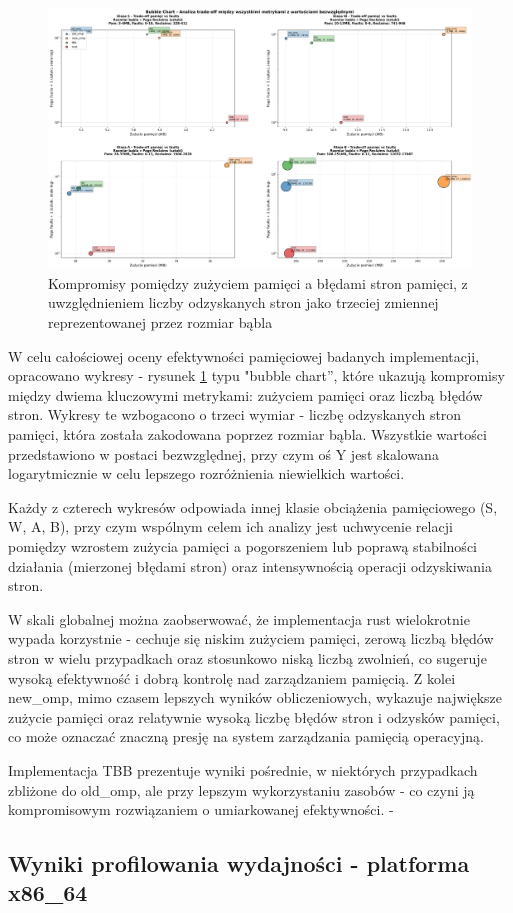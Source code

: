 \begin{figure}[H]
    \centering
    \includegraphics[width=\textwidth]{analiza/images/parallel/cg/chart_06_bubble_chart.png}
    \caption{Kompromisy  pomiędzy zużyciem pamięci a błędami stron pamięci, z uwzględnieniem liczby odzyskanych stron jako trzeciej zmiennej reprezentowanej przez rozmiar bąbla}
    \label{cg_kompromisy_pamiec_bledy}
\end{figure}

W celu całościowej oceny efektywności pamięciowej badanych implementacji, opracowano wykresy - rysunek \ref{cg_kompromisy_pamiec_bledy} typu "bubble chart”, które ukazują kompromisy między dwiema kluczowymi metrykami: zużyciem pamięci oraz liczbą błędów stron. Wykresy te wzbogacono o trzeci wymiar - liczbę odzyskanych stron pamięci, która została zakodowana poprzez rozmiar bąbla. Wszystkie wartości przedstawiono w postaci bezwzględnej, przy czym oś Y jest skalowana logarytmicznie w celu lepszego rozróżnienia niewielkich wartości.

Każdy z czterech wykresów odpowiada innej klasie obciążenia pamięciowego (S, W, A, B), przy czym wspólnym celem ich analizy jest uchwycenie relacji pomiędzy wzrostem zużycia pamięci a pogorszeniem lub poprawą stabilności działania (mierzonej błędami stron) oraz intensywnością operacji odzyskiwania stron.

W skali globalnej można zaobserwować, że implementacja rust wielokrotnie wypada korzystnie - cechuje się niskim zużyciem pamięci, zerową liczbą błędów stron w wielu przypadkach oraz stosunkowo niską liczbą zwolnień, co sugeruje wysoką efektywność i dobrą kontrolę nad zarządzaniem pamięcią. Z kolei new\_omp, mimo czasem lepszych wyników obliczeniowych, wykazuje największe zużycie pamięci oraz relatywnie wysoką liczbę błędów stron i odzysków pamięci, co może oznaczać znaczną presję na system zarządzania pamięcią operacyjną.

Implementacja TBB prezentuje wyniki pośrednie, w niektórych przypadkach zbliżone do old\_omp, ale przy lepszym wykorzystaniu zasobów - co czyni ją kompromisowym rozwiązaniem o umiarkowanej efektywności.
-
\subsection{Wyniki profilowania wydajności - platforma x86\_64}